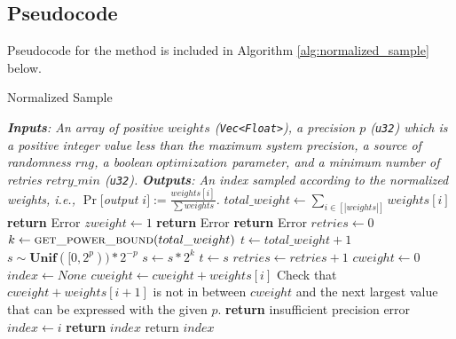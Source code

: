 \documentclass[11pt]{article}
\newcommand{\LineComment}[1]{\Statex \textit{#1}}
\theoremstyle{definition}
\DeclareMathOperator*{\argmin}{arg\,min}
\newcommand{\unsigned}[1]{{\tt u#1}}
\begin{document}
\subsection{Pseudocode}
Pseudocode for the method is included in Algorithm \ref{alg:normalized_sample} below. 

\begin{algorithm}[H]
  \caption{Normalized Sample}
  \label{alg:normalized_sample}
\begin{algorithmic}[1]
  \LineComment{\textbf{Inputs}: An array of positive $weights$ ({\tt Vec<Float>}), a precision $p$ (\unsigned{32}) which is a positive integer value less than the maximum system precision, a source of randomness $rng$, a boolean $optimization$ parameter, and a minimum number of retries $retry\_min$ (\unsigned{32}).} 
  \LineComment{\textbf{Outputs}: An index sampled according to the normalized weights, i.e., $\Pr[$output $i] := \frac{weights[i]}{\sum weights}$.}
    \State $total\_weight \leftarrow \sum_{i \in [|weights|]}weights[i]$ 
        \State \textbf{return} Error
    \EndIf
            \State $zweight \leftarrow 1$ 
                \State \textbf{return} Error
            \EndIf
        \EndIf
    \EndFor
     
        \State \textbf{return} Error
    \EndIf
    \State $retries \leftarrow 0$
    \State $k \leftarrow \textsc{get\_power\_bound}(total\_weight)$ \Comment{$\argmin_{k \in \mathbb{N}} \{2^k \geq total\_weight\}$}
    \State $t \leftarrow total\_weight + 1$ 
     \label{line:ns_while} 
    \State $s \sim \mathbf{Unif}([0,2^{p}))*2^{-p}$ \label{line:sample_s} \Comment{$s$ is a uniformly random $p$ bit value between $[0,1)$, see {\tt ArithmeticConfig::get\_rand\_float()}.}\label{line:ns_sample}
    \State $s \leftarrow s * 2^k$ \Comment{$s$ is scaled to between $[0, 2^k)$}
        \State $t \leftarrow s$
    \EndIf
    \State $retries \leftarrow retries + 1$
    \EndWhile
    \State $cweight \leftarrow 0$
    \State $index \leftarrow None$
     
    \label{line:ns_forloop}
        \State $cweight \leftarrow cweight + weights[i]$
                \State Check that $cweight + weights[i+1]$ is not in between $cweight$ and the next largest value that can be expressed with the given $p$.
                \State \textbf{return} insufficient precision error
                \EndIf
                \State $index\leftarrow i$
                    \State \textbf{return} $index$
                \EndIf
            \EndIf
        \EndIf
    \EndFor
    \State return $index$
    \EndProcedure
  \end{algorithmic}
\end{algorithm}
\end{document}
